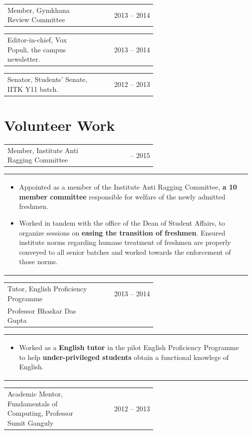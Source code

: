 \documentclass[a4paper]{article} %
\newcommand{\verticalspacing}{-0.25cm}
\newcommand{\headspace}{-0.3cm}
\newcommand{\cproject}[5]{
    \begin{tabular}{p{0.60\linewidth}r}
        \textcolor{NavyBlue}{\small #2} & \multicolumn{1}{m{7.3cm}}{\raggedleft \small {\textsc{#1}}}\\
        \small {#3} & \small {#4}
    \end{tabular}
    \begin{tabular}{p{0.98\linewidth}}
    \vspace{-0.3cm}
        \small{#5}
    \end{tabular}
    \vspace{\verticalspacing{}}
}
\newcommand{\gitproject}[3]{
    \begin{tabular}{p{0.60\linewidth}r}
        \textcolor{NavyBlue}{\small #2} & \multicolumn{1}{m{7.3cm}}{\raggedleft #1}\\
    \end{tabular}
    \begin{tabular}{p{0.98\linewidth}}
        \vspace{\headspace{}}
        \small{#3}
    \end{tabular}
    \vspace{\verticalspacing{}}
    \vspace{-0.2cm} %
}
\newcommand{\skill}[2]{
    \begin{tabular}{p{0.60\linewidth}r}
        \small {#2} & \multicolumn{1}{m{7.3cm}}{\raggedleft \textsc{\small #1}}\\
    \end{tabular}
    \vspace{\verticalspacing{}}
}
\begin{document}
\skill
    {2013 -- 2014}
    {Member, Gymkhana Review Committee}

\skill
    {2013 -- 2014}
    {Editor-in-chief, Vox Populi, the campus newsletter.}

\skill
    {2012 -- 2013}
    {Senator, Students' Senate, IITK Y11 batch.}


\section{Volunteer Work}

\gitproject
    {2014 -- 2015}
    {Member, Institute Anti Ragging Committee}
    {
        \begin{itemize}[leftmargin=0.5cm]
            \item Appointed as a member of the Institute Anti Ragging Committee, \textbf{a 10 member committee} responsible
                for welfare of the newly admitted freshmen.
            \item Worked in tandem with the office of the Dean of Student Affairs, to organize sessions
                on \textbf{easing the transition of freshmen}.  Ensured institute norms regarding humane treatment
                of freshmen are properly conveyed to all senior batches and worked towards the enforcement of those norms.
        \end{itemize}
    }

\cproject
    {2013 -- 2014}
    {Tutor, English Proficiency Programme}
    {Professor Bhaskar Das Gupta}
    {}
    {
       \begin{itemize}[leftmargin=0.5cm]
           \item Worked as a \textbf{English tutor} in the pilot English Proficiency Programme to help
               \textbf{under-privileged students} obtain a functional knowlege of English.
       \end{itemize}
    }

\skill
    {2012 -- 2013}
    {Academic Mentor, Fundamentals of Computing, Professor Sumit Ganguly}
\end{document}
